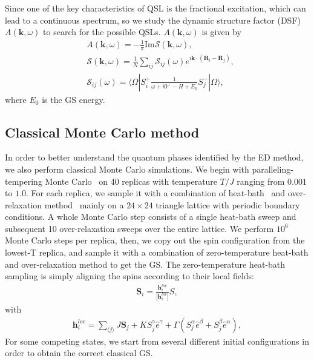 \documentclass[aps,prb,reprint,amsfonts,amsmath,amssymb,showpacs,groupedaddress,superscriptaddress]{revtex4-1}
\begin{document}
Since one of the key characteristics of QSL is the fractional excitation, which can lead to a continuous spectrum, so we study the dynamic structure factor (DSF) $A(\bm{k}, \omega)$ to search for the possible QSLs. $A(\bm{k}, \omega)$ is given by
\begin{align}
    & A(\bm{k}, \omega) = -\frac{1}{\pi} \text{Im} \mathcal{S}(\bm{k}, \omega), \label{eq:Akomega} \\
    & \mathcal{S}(\bm{k}, \omega) = \frac{1}{N} \sum_{ij} \mathcal{S}_{ij}(\omega) e^{i \bm{k} \cdot (\bm{R}_i - \bm{R}_j)}, \\
    & \mathcal{S}_{ij}(\omega) = \langle \Omega | S_i^{+} \frac{1}{\omega + i0^{+} - H + E_0} S_j^{-} | \Omega \rangle, \label{eq:GreenFunction}
\end{align}
where $E_0$ is the GS energy.

\subsection{\label{subsec:MethodMC}Classical Monte Carlo method}

In order to better understand the quantum phases identified by the ED method, we also perform classical Monte Carlo simulations. We begin with paralleling-tempering Monte Carlo~\cite{Hukushima96} on 40 replicas with temperature $T/J$ ranging from $0.001$ to $1.0$. For each replica, we sample it with a combination of heat-bath~\cite{Miyatake84} and over-relaxation method~\cite{Berg} mainly on a $24 \times 24$ triangle lattice with periodic boundary conditions. A whole Monte Carlo step consists of a single heat-bath sweep and subsequent 10 over-relaxation sweeps over the entire lattice. We perform $10^6$ Monte Carlo steps per replica, then, we copy out the spin configuration from the lowest-T replica, and sample it with a combination of zero-temperature heat-bath and over-relaxation method to get the GS. The zero-temperature heat-bath sampling is simply aligning the spins according to their local fields:
\begin{align}
    \bm{S}_{i} = \frac{\bm{h}_{i}^{loc}}{|\bm{h}_{i}^{loc}|} S,
\end{align}
with
\begin{align}
    \bm{h}_{i}^{loc} = \sum_{\langle j \rangle} J \bm{S}_{j} + K {S}^{\gamma}_{j} \hat{e}^{\gamma} + \Gamma (S^{\alpha}_{j} \hat{e}^{\beta} + S^{\beta}_{j} \hat{e}^{\alpha}),
\end{align}
For some competing states, we start from several different initial configurations in order to obtain the correct classical GS.
\end{document}
